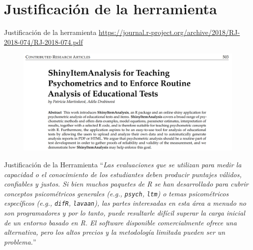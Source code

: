 \documentclass{beamer}
\begin{document}
\section{Justificación de la herramienta}
\begin{frame}{Justificación de la herramienta}
\tiny{\textcolor{blue}{\url{https://journal.r-project.org/archive/2018/RJ-2018-074/RJ-2018-074.pdf}}}
\begin{figure}
\centering
\includegraphics[width=1\textwidth]{ShinyItemAnalysis.png}
\end{figure}
\cite{Martinkova2018}
\end{frame}

\begin{frame}{Justificación de la Herramienta}
``\textit{Las evaluaciones que se utilizan para medir la capacidad o el conocimiento de los estudiantes deben producir puntajes válidos, confiables y justos. Si bien muchos paquetes de R se han desarrollado para cubrir conceptos psicométricos generales (e.g., \texttt{psych}, \texttt{ltm}) o temas psicométricos específicos (e.g., \texttt{difR}, \texttt{lavaan}), las partes interesadas en esta área a menudo no son programadores y
por lo tanto, puede resultarle difícil superar la carga inicial de un entorno basado en R. El software disponible comercialmente ofrece una alternativa, pero los altos precios y la metodología limitada pueden ser un problema.}''\\
\cite[p. 503]{Martinkova2018}
\end{frame}
\end{document}
